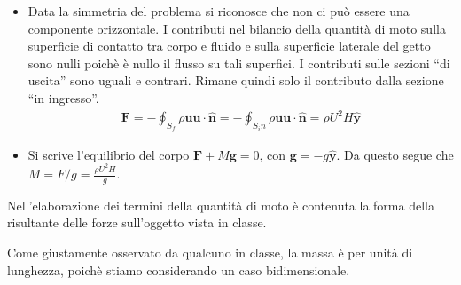 \documentclass[letterpaper,10pt,italian]{jupyterBook}
\begin{document}
\begin{itemize}
\item {} 
\sphinxAtStartPar
Data la simmetria del problema si riconosce che non ci può essere
una componente orizzontale. I contributi nel bilancio della quantità
di moto sulla superficie di contatto tra corpo e fluido e sulla
superficie laterale del getto sono nulli poichè è nullo il flusso su
tali superfici. I contributi sulle sezioni “di uscita” sono uguali e
contrari. Rimane quindi solo il contributo dalla sezione “in
ingresso”.
\begin{equation*}
\begin{split}\bm{F} = - \oint_{S_f} \rho \bm{u} \bm{u} \cdot \bm{\hat{n}} = 
               - \oint_{S_in} \rho \bm{u} \bm{u} \cdot \bm{\hat{n}} = 
               \rho U^2 H \bm{\hat{y}}\end{split}
\end{equation*}
\item {} 
\sphinxAtStartPar
Si scrive l’equilibrio del corpo \(\bm{F} + M \bm{g} = 0\), con
\(\bm{g} = - g \bm{\hat{y}}\). Da questo segue che
\(M = F/g = \frac{\rho U^2 H}{g}\).

\end{itemize}

\sphinxAtStartPar
{} Nell’elaborazione dei termini della quantità di moto è
contenuta la forma della risultante delle forze sull’oggetto vista in
classe.

\sphinxAtStartPar
Come giustamente osservato da qualcuno in classe, la massa è per unità
di lunghezza, poichè stiamo considerando un caso bidimensionale.

\sphinxstepscope
\end{document}
